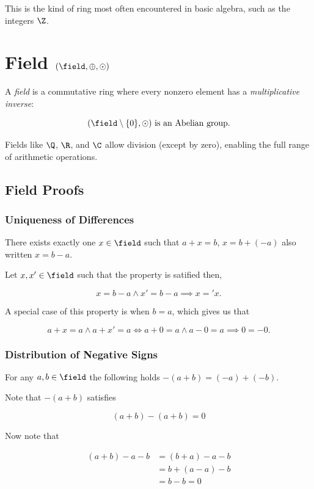 This is the kind of ring most often encountered in basic algebra, such as the integers \(\Z\).

\section{Field \texorpdfstring{\((\field, \oplus, \odot)\)}{}}

A \emph{field} is a commutative ring where every nonzero element has a \emph{multiplicative inverse}:

\[
    (\field \setminus \{0\}, \odot) \text{ is an Abelian group}.
\]

Fields like \(\Q\), \(\R\), and \(\C\) allow division (except by zero), enabling the full range of arithmetic operations.

\subsection{Field Proofs}

\subsubsection{Uniqueness of Differences}

There exists exactly one \(x \in \field\) such that \(a + x = b\), \(x = b + (-a)\) also written 
\(x = b - a\).

Let \(x, x' \in \field\) such that the property is satified then, 

\[
    x = b - a \land x' = b - a \implies x = 'x.
\]

\QED

A special case of this property is when \(b = a\), which gives us that 

\[
    a + x = a \land a + x' = a \iff a + 0 = a \land a - 0 = a \implies 0 = -0.
\]

\subsubsection{Distribution of Negative Signs}

For any \(a, b \in \field\) the following holds \(-(a + b)  = (-a) + (-b)\).

Note that \(-(a + b)\) satisfies

\[
    (a + b) - (a + b) = 0
\]

Now note that 

\begin{align*}
    (a + b) - a - b &=  (b + a) - a - b \\
    &= b + (a - a) - b \\
    &= b - b = 0
\end{align*}

